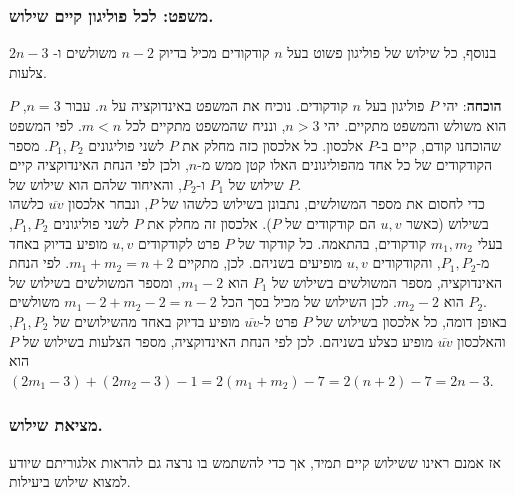 \documentclass[
]{book}
\begin{document}
\hypertarget{ux5deux5e9ux5e4ux5d8-ux5dcux5dbux5dc-ux5e4ux5d5ux5dcux5d9ux5d2ux5d5ux5df-ux5e7ux5d9ux5d9ux5dd-ux5e9ux5d9ux5dcux5d5ux5e9.}{%
\subsubsection*{משפט: לכל פוליגון קיים שילוש.}\label{ux5deux5e9ux5e4ux5d8-ux5dcux5dbux5dc-ux5e4ux5d5ux5dcux5d9ux5d2ux5d5ux5df-ux5e7ux5d9ux5d9ux5dd-ux5e9ux5d9ux5dcux5d5ux5e9.}}

בנוסף, כל שילוש של פוליגון פשוט בעל \(n\) קודקודים מכיל בדיוק \(n-2\) משולשים ו- \(2n-3\) צלעות.

\textbf{הוכחה}: יהי \(P\) פוליגון בעל \(n\) קודקודים. נוכיח את המשפט באינדוקציה על \(n\). עבור \(n=3\), \(P\) הוא משולש והמשפט מתקיים. יהי \(n>3\), ונניח שהמשפט מתקיים לכל \(m<n\). לפי המשפט שהוכחנו קודם, קיים ב-\(P\) אלכסון. כל אלכסון כזה מחלק את \(P\) לשני פוליגונים \(P_1,P_2\). מספר הקודקודים של כל אחד מהפוליגונים האלו קטן ממש מ-\(n\), ולכן לפי הנחת האינדוקציה קיים שילוש של \(P_ 1\) ו-\(P_ 2\), והאיחוד שלהם הוא שילוש של \(P\).\\
כדי לחסום את מספר המשולשים, נתבונן בשילוש כלשהו של \(P\), ונבחר אלכסון \(\overline{uv}\) כלשהו בשילוש (כאשר \(u, v\) הם קודקודים של \(P\)). אלכסון זה מחלק את \(P\) לשני פוליגונים \(P_ 1, P_ 2\), בעלי \(m_ 1, m_ 2\) קודקודים, בהתאמה. כל קודקוד של \(P\) פרט לקודקודים \(u, v\) מופיע בדיוק באחד מ-\(P_ 1, P_ 2\), והקודקודים \(u, v\) מופיעים בשניהם. לכן, מתקיים \(m_1+m_2= n+2\). לפי הנחת האינדוקציה, מספר המשולשים בשילוש של \(P_1\) הוא \(m_1-2\), ומספר המשולשים בשילוש של \(P_2\) הוא \(m_2- 2\). לכן השילוש של מכיל בסך הכל \(m_1-2+ m_2-2 = n- 2\) משולשים.\\
באופן דומה, כל אלכסון בשילוש של \(P\) פרט ל-\(\overline{u v}\) מופיע בדיוק באחד מהשילושים של \(P_1, P_2\), והאלכסון \(\overline{u v }\) מופיע כצלע בשניהם. לכן לפי הנחת האינדוקציה, מספר הצלעות בשילוש של \(P\) הוא \((2m_1 - 3)+ (2m_2- 3 )- 1 = 2 (m_1+m_2)-7=2(n+2)-7=2n-3\).

\hypertarget{ux5deux5e6ux5d9ux5d0ux5ea-ux5e9ux5d9ux5dcux5d5ux5e9.}{%
\subsubsection*{מציאת שילוש.}\label{ux5deux5e6ux5d9ux5d0ux5ea-ux5e9ux5d9ux5dcux5d5ux5e9.}}

אז אמנם ראינו ששילוש קיים תמיד, אך כדי להשתמש בו נרצה גם להראות אלגוריתם שיודע למצוא שילוש ביעילות.
\end{document}
